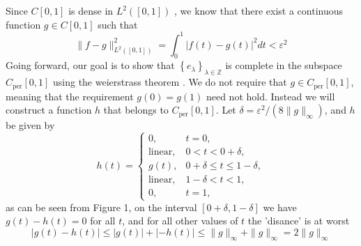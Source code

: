 \documentclass[../thesis.tex]{subfiles}
\begin{document}
Since $C[0,1]$ is dense in $L^2([0,1])$ \cite{heilMetricsNormsInner2018}, we know that there exist a continuous function $g \in C[0,1]$ such that %
\begin{equation}
    \| f-g \|_{L^2([0,1])}^2 = \int_0^1 \left|f(t)-g(t) \right|^2dt < \varepsilon^2
\end{equation}
Going forward, our goal is to show that $\left\{ e_{\lambda} \right\}_{\lambda\in \mathbb{Z}}$ is complete in the subspace $C_{\text{per}}[0,1]$ using the weierstrass theorem \cite{durenInvitationClassicalAnalysis2012}. We do not require that $g \in C_{\text{per}}[0,1]$, meaning that the requirement $g(0)=g(1)$ need not hold. Instead we will construct a function $h$ that belongs to $C_{\text{per}}[0,1]$. Let  $\delta = \varepsilon^2/(8\|g\|_\infty)$, and $h$  be given by %
\begin{equation*}
    h(t) = 
    \begin{cases} 0, &  t=0,\\  
        \text{linear}, &  0<t<0+\delta,\\ 
        g(t), & 0+\delta \leq t \leq 1-\delta,\\ 
        \text{linear}, &  1-\delta <t<1,\\ 
        0, &  t=1,
    \end{cases}
\end{equation*}
as can be seen from Figure 1, on the interval $[0+\delta, 1-\delta]$ we have $g(t)-h(t)= 0$ for all $t$, and for all other values of $t$ the 'disance' is at worst 
\begin{equation*}
    \left|g(t)-h(t) \right| \leq |g(t)| + |-h(t)| \leq \|g \|_{\infty} + \|g \|_{\infty} = 2 \|g \|_{\infty}
\end{equation*}
\end{document}

